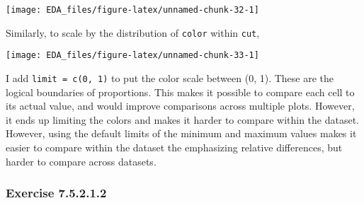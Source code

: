 \documentclass[]{book}
\newenvironment{Shaded}{\begin{snugshade}}{\end{snugshade}}
\newcommand{\DataTypeTok}[1]{\textcolor[rgb]{0.13,0.29,0.53}{#1}}
\newcommand{\DecValTok}[1]{\textcolor[rgb]{0.00,0.00,0.81}{#1}}
\newcommand{\KeywordTok}[1]{\textcolor[rgb]{0.13,0.29,0.53}{\textbf{#1}}}
\newcommand{\NormalTok}[1]{#1}
\newcommand{\OperatorTok}[1]{\textcolor[rgb]{0.81,0.36,0.00}{\textbf{#1}}}
\newcommand{\StringTok}[1]{\textcolor[rgb]{0.31,0.60,0.02}{#1}}
\theoremstyle{plain}
\theoremstyle{remark}
\begin{document}
\begin{center}\texttt{[image: EDA\_files/figure-latex/unnamed-chunk-32-1]} \end{center}

Similarly, to scale by the distribution of \texttt{color} within
\texttt{cut},

\begin{Shaded}
\end{Shaded}

\begin{center}\texttt{[image: EDA\_files/figure-latex/unnamed-chunk-33-1]} \end{center}

I add \texttt{limit\ =\ c(0,\ 1)} to put the color scale between (0, 1).
These are the logical boundaries of proportions. This makes it possible
to compare each cell to its actual value, and would improve comparisons
across multiple plots. However, it ends up limiting the colors and makes
it harder to compare within the dataset. However, using the default
limits of the minimum and maximum values makes it easier to compare
within the dataset the emphasizing relative differences, but harder to
compare across datasets.

\hypertarget{exercise-7.5.2.1.2}{%
\subsubsection*{\texorpdfstring{Exercise
{7.5.2.1.2}}{Exercise 7.5.2.1.2}}\label{exercise-7.5.2.1.2}}
\end{document}
